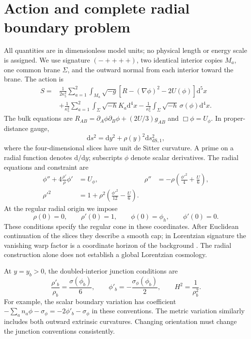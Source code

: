 \documentclass[11pt]{article}
\newcommand{\dd}{\mathrm{d}}
\newcommand{\dS}{\mathrm{dS}}
\begin{document}
\section{Action and complete radial boundary problem}
All quantities are in dimensionless model units; no physical length or energy scale is assigned. We use signature $(-++++)$, two identical interior copies $M_a$, one common brane $\Sigma$, and the outward normal from each interior toward the brane. The action is
\begin{align}
S={}&\frac{1}{2\kappa_5^2}\sum_{a=1}^2\int_{M_a}\sqrt{-g}
 \left[R-(\nabla\phi)^2-2U(\phi)\right]\dd^5x \nonumber\\
 &+\frac{1}{\kappa_5^2}\sum_{a=1}^2\int_\Sigma\sqrt{-h}K_a\dd^4x
 -\frac{1}{\kappa_5^2}\int_\Sigma\sqrt{-h}\,\sigma(\phi)\dd^4x .
\label{eq:action}
\end{align}
The bulk equations are $R_{AB}=\partial_A\phi\partial_B\phi+(2U/3)g_{AB}$ and $\Box\phi=U_\phi$. In proper-distance gauge,
\begin{equation}
\dd s^2=\dd y^2+\rho(y)^2\dd s^2_{\dS,1},
\end{equation}
where the four-dimensional slices have unit de Sitter curvature. A prime on a radial function denotes $\dd/\dd y$; subscripts $\phi$ denote scalar derivatives. The radial equations and constraint are
\begin{align}
\phi''+4\frac{\rho'}{\rho}\phi'&=U_\phi,
 &\rho''&=-\rho\left(\frac{\phi'^2}{4}+\frac{U}{6}\right),\label{eq:evolution}\\
\rho'^2&=1+\rho^2\left(\frac{\phi'^2}{12}-\frac{U}{6}\right).
\label{eq:constraint}
\end{align}
At the regular radial origin we impose
\begin{equation}
\rho(0)=0,\qquad\rho'(0)=1,\qquad
\phi(0)=\phi_h,\qquad\phi'(0)=0.\label{eq:cone}
\end{equation}
These conditions specify the regular cone in these coordinates. After Euclidean continuation of the slices they describe a smooth cap; in Lorentzian signature the vanishing warp factor is a coordinate horizon of the background \cite{curvedflows}. The radial construction alone does not establish a global Lorentzian cosmology.

At $y=y_b>0$, the doubled-interior junction conditions are
\begin{equation}
\frac{\rho'_b}{\rho_b}=\frac{\sigma(\phi_b)}{6},\qquad
\phi'_b=-\frac{\sigma_\phi(\phi_b)}{2},\qquad
H^2=\frac{1}{\rho_b^2}.\label{eq:junctions}
\end{equation}
For example, the scalar boundary variation has coefficient
$-\sum_a n_a\phi-\sigma_\phi=-2\phi'_b-\sigma_\phi$ in these conventions. The metric variation similarly includes both outward extrinsic curvatures. Changing orientation must change the junction conventions consistently.
\end{document}
